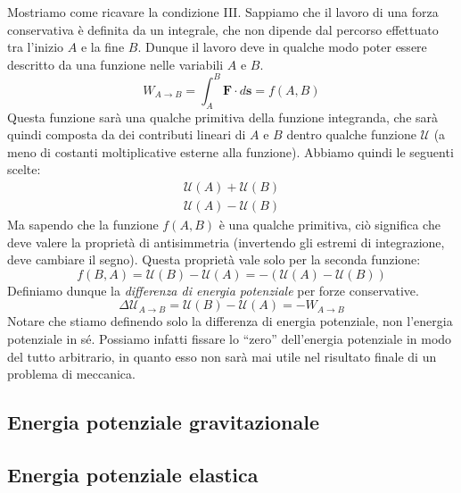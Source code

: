 Mostriamo come ricavare la condizione III. Sappiamo che il lavoro di una
forza conservativa è definita da un integrale, che non dipende dal percorso
effettuato tra l'inizio $A$ e la fine $B$. Dunque il lavoro deve in qualche modo
poter essere descritto da una funzione nelle variabili $A$ e $B$.
\[ W_{A \to B} = \int_{A}^{B}\mathbf{F}\cdot d\mathbf{s} = f(A,B) \]
Questa funzione sarà una qualche primitiva della funzione integranda, che sarà
quindi composta da dei contributi lineari di $A$ e $B$ dentro qualche funzione
$\mathcal{U}$ (a meno di costanti moltiplicative esterne alla funzione).
Abbiamo quindi le seguenti scelte:
\begin{align*}
    \mathcal{U}(A) + \mathcal{U}(B)\\
    \mathcal{U}(A) - \mathcal{U}(B)
\end{align*}
Ma sapendo che la funzione $f(A,B)$ è una qualche primitiva, ciò significa che
deve valere la proprietà di antisimmetria (invertendo gli estremi di integrazione,
deve cambiare il segno). Questa proprietà vale solo per la seconda funzione:
\[ f(B,A) = \mathcal{U}(B) - \mathcal{U}(A) = - (\mathcal{U}(A) - \mathcal{U}(B)) \]
Definiamo dunque la \textit{differenza di energia potenziale} per forze conservative.
\[ \Delta\mathcal{U}_{A\to B} = \mathcal{U}(B) - \mathcal{U}(A) = -W_{A\to B} \]
Notare che stiamo definendo solo la differenza di energia potenziale, non l'energia
potenziale in sé. Possiamo infatti fissare lo ``zero'' dell'energia potenziale in
modo del tutto arbitrario, in quanto esso non sarà mai utile nel risultato finale
di un problema di meccanica.

\subsection{Energia potenziale gravitazionale}
\subsection{Energia potenziale elastica}

